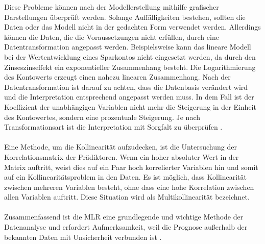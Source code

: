 Diese Probleme können nach der Modellerstellung mithilfe grafischer Darstellungen überprüft werden. Solange Auffälligkeiten bestehen, sollten die Daten oder das Modell nicht in der gedachten Form verwendet werden. Allerdings können die Daten, die die Voraussetzungen nicht erfüllen, durch eine Datentransformation angepasst werden. Beispielsweise kann das lineare Modell bei der Wertentwicklung eines Sparkontos nicht eingesetzt werden, da durch den Zinseszinseffekt ein exponentieller Zusammenhang besteht. Die Logarithmierung des Kontowerts erzeugt einen nahezu linearen Zusammenhang. Nach der Datentransformation ist darauf zu achten, dass die Datenbasis verändert wird und die Interpretation entsprechend angepasst werden muss. In dem Fall ist der Koeffizient der unabhängigen Variablen nicht mehr die Steigerung in der Einheit des Kontowertes, sondern eine prozentuale Steigerung. Je nach Transformationsart ist die Interpretation mit Sorgfalt zu überprüfen \cite{akinkunmi2018data}. \\\\
Eine Methode, um die Kollinearität aufzudecken, ist die Untersuchung der Korrelationsmatrix der Prädiktoren. Wenn ein hoher absoluter Wert in der Matrix auftritt, weist dies auf ein Paar hoch korrelierter Variablen hin und somit auf ein Kollinearitätsproblem in den Daten. Es ist möglich, dass Kollinearität zwischen mehreren Variablen besteht, ohne dass eine hohe Korrelation zwischen allen Variablen auftritt. Diese Situation wird als Multikollinearität bezeichnet.\\\\
Zusammenfassend ist die \ac{MLR} eine grundlegende und wichtige Methode der Datenanalyse und erfordert Aufmerksamkeit, weil die Prognose außerhalb der 
bekannten Daten mit Unsicherheit verbunden ist \cite{akinkunmi2018data}. 

